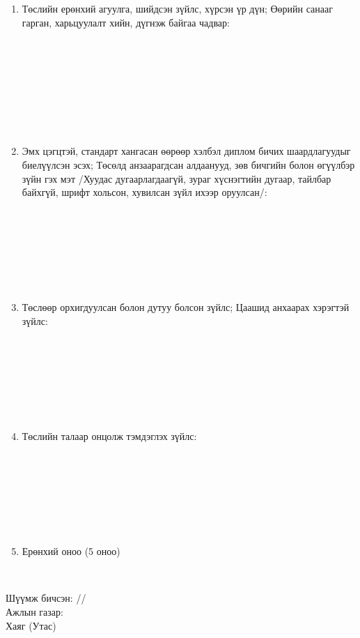 \begin{titlepage}
\begin{enumerate}
\begin{center}
\dotfill \\[0.4cm]
\end{center}
\item Төслийн ерөнхий агуулга, шийдсэн зүйлс, хүрсэн үр дүн; Өөрийн санааг гарган, харьцуулалт хийн, дүгнэж байгаа чадвар:
\begin{center}
\dotfill \\[0.1cm]
\dotfill \\[0.1cm]
\dotfill \\[0.1cm]
\dotfill \\[0.1cm]
\dotfill \\[0.1cm]
\dotfill \\[0.1cm]
\dotfill \\[0.4cm]
\end{center}
\item Эмх цэгцтэй, стандарт хангасан өөрөөр хэлбэл диплом бичих шаардлагуудыг биелүүлсэн эсэх; Төсөлд анзаарагдсан алдаанууд, зөв бичгийн болон өгүүлбэр зүйн гэх мэт /Хуудас дугаарлагдаагүй, зураг хүснэгтийн дугаар, тайлбар байхгүй, шрифт хольсон, хувилсан зүйл ихээр оруулсан/:
\begin{center}
\dotfill \\[0.1cm]
\dotfill \\[0.1cm]
\dotfill \\[0.1cm]
\dotfill \\[0.1cm]
\dotfill \\[0.1cm]
\dotfill \\[0.4cm]
\end{center}
\item Төслөөр орхигдуулсан болон дутуу болсон зүйлс; Цаашид анхаарах хэрэгтэй зүйлс:
\begin{center}
\dotfill \\[0.1cm]
\dotfill \\[0.1cm]
\dotfill \\[0.1cm]
\dotfill \\[0.1cm]
\dotfill \\[0.1cm]
\dotfill \\[0.4cm]
\end{center}
\item Төслийн талаар онцолж тэмдэглэх зүйлс:
\begin{center}
\dotfill \\[0.1cm]
\dotfill \\[0.1cm]
\dotfill \\[0.1cm]
\dotfill \\[0.1cm]
\dotfill \\[0.1cm]
\dotfill \\[0.4cm]
\end{center}
\item Ерөнхий оноо (5 оноо)
\begin{center}
\dotfill \\[1cm]
\end{center}
\end{enumerate}
Шүүмж бичсэн: \makebox[3cm]{\dotfill} /\readname/ \\[0.5cm]
Ажлын газар: \dotfill \\[0.5cm]
Хаяг (Утас) \makebox[5cm]{\dotfill}
\end{titlepage}
\fi
